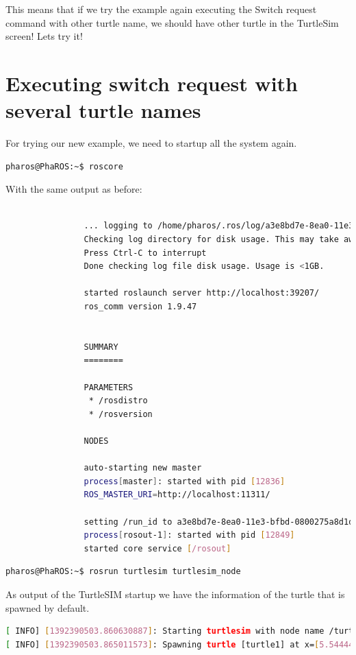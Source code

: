 \documentclass[a4paper,10pt,twoside]{book}
\begin{document}
			This means that if we try the example again executing the Switch request command with other turtle name, we should have other turtle in the TurtleSim screen! Lets try it!

			
			\section{Executing switch request with several turtle names}
			
			For trying our new example, we need to startup all the system again. 
			
			
			\begin{lstlisting}[language=bash,title={Starting up ROS}]
				pharos@PhaROS:~$ roscore
			\end{lstlisting}
			
			With the same output as before:
			
			\begin{lstlisting}[language=bash,title={Starting up ROS - Output}]
				
				... logging to /home/pharos/.ros/log/a3e8bd7e-8ea0-11e3-bfbd-0800275a8d1d/roslaunch-PhaROS-12822.log
				Checking log directory for disk usage. This may take awhile.
				Press Ctrl-C to interrupt
				Done checking log file disk usage. Usage is <1GB.

				started roslaunch server http://localhost:39207/
				ros_comm version 1.9.47


				SUMMARY
				========

				PARAMETERS
				 * /rosdistro
				 * /rosversion

				NODES

				auto-starting new master
				process[master]: started with pid [12836]
				ROS_MASTER_URI=http://localhost:11311/

				setting /run_id to a3e8bd7e-8ea0-11e3-bfbd-0800275a8d1d
				process[rosout-1]: started with pid [12849]
				started core service [/rosout]
			\end{lstlisting}
			
			
			
			\begin{lstlisting}[language=bash,title={Starting up TurtleSIM}]
				pharos@PhaROS:~$ rosrun turtlesim turtlesim_node
			\end{lstlisting}
			
				As output of the TurtleSIM startup we have the information of the turtle that is spawned by default.
			
			\begin{lstlisting}[language=bash,title={Starting up TurtleSIM - Output}]
[ INFO] [1392390503.860630887]: Starting turtlesim with node name /turtlesim
[ INFO] [1392390503.865011573]: Spawning turtle [turtle1] at x=[5.544445], y=[5.544445], theta=[0.000000]
			\end{lstlisting}
			
\end{document}

